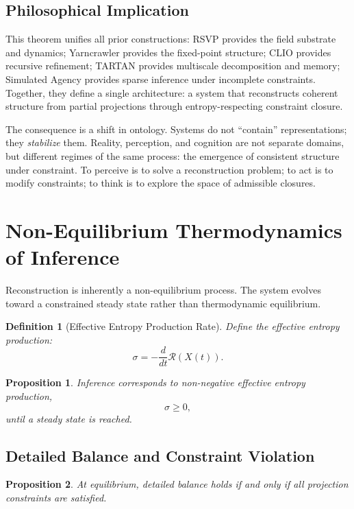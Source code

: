 \documentclass[12pt]{article}
\newtheorem{definition}{Definition}
\newtheorem{proposition}{Proposition}
\begin{document}
\subsection{Philosophical Implication}

This theorem unifies all prior constructions: RSVP provides the field substrate and dynamics; Yarncrawler provides the fixed-point structure; CLIO provides recursive refinement; TARTAN provides multiscale decomposition and memory; Simulated Agency provides sparse inference under incomplete constraints. Together, they define a single architecture: a system that reconstructs coherent structure from partial projections through entropy-respecting constraint closure.

The consequence is a shift in ontology. Systems do not ``contain'' representations; they \emph{stabilize} them. Reality, perception, and cognition are not separate domains, but different regimes of the same process: the emergence of consistent structure under constraint. To perceive is to solve a reconstruction problem; to act is to modify constraints; to think is to explore the space of admissible closures.

\section{Non-Equilibrium Thermodynamics of Inference}

Reconstruction is inherently a non-equilibrium process. The system evolves toward a constrained steady state rather than thermodynamic equilibrium.

\begin{definition}[Effective Entropy Production Rate]
Define the effective entropy production:
\[
\sigma = -\frac{d}{dt} \mathcal{R}(X(t)).
\]
\end{definition}

\begin{proposition}
Inference corresponds to non-negative effective entropy production,
\[
\sigma \geq 0,
\]
until a steady state is reached.
\end{proposition}

\subsection{Detailed Balance and Constraint Violation}

\begin{proposition}
At equilibrium, detailed balance holds if and only if all projection constraints are satisfied.
\end{proposition}
\end{document}
